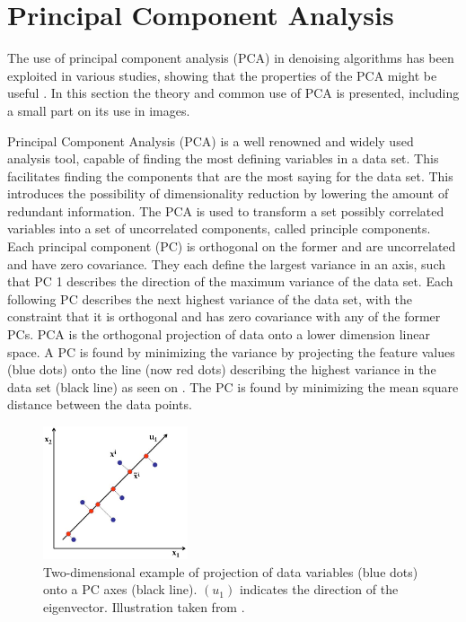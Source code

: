 
\section{Principal Component Analysis} \label{sec:PCA}

The use of principal component analysis (PCA) in denoising algorithms has been exploited in various studies, showing that the properties of the PCA might be useful \cite{Behzadi2013}. In this section the theory and common use of PCA is presented, including a small part on its use in images. 

Principal Component Analysis (PCA) is a well renowned and widely used analysis tool, capable of finding the most defining variables in a data set. This facilitates finding the components that are the most saying for the data set. This introduces the possibility of dimensionality reduction by lowering the amount of redundant information. The PCA is used to transform a set possibly correlated variables into a set of uncorrelated components, called principle components. Each principal component (PC) is
orthogonal on the former and are uncorrelated and have zero covariance. They each define the largest
variance in an axis, such that PC 1 describes the direction of the maximum variance of the data set. Each
following PC describes the next highest variance of the data set, with the constraint that it is orthogonal
and has zero covariance with any of the former PCs. PCA is the orthogonal projection of data onto a
lower dimension linear space.  A PC is found by minimizing the variance by projecting the feature values (blue dots) onto the line (now red dots) describing the highest variance in the data set (black line) as seen on . The PC is found by minimizing the mean square distance between the data points. \cite{Semmlow2004}

\begin{figure}[H] 
	\includegraphics[width=0.38\textwidth]{figures/aBackground/projection}
	\caption{Two-dimensional example of projection of data variables (blue dots) onto a PC axes (black line). $(u_1)$ indicates the direction of the eigenvector. Illustration taken from \cite{PCA2018}.}
	\label{projection}
\end{figure}

